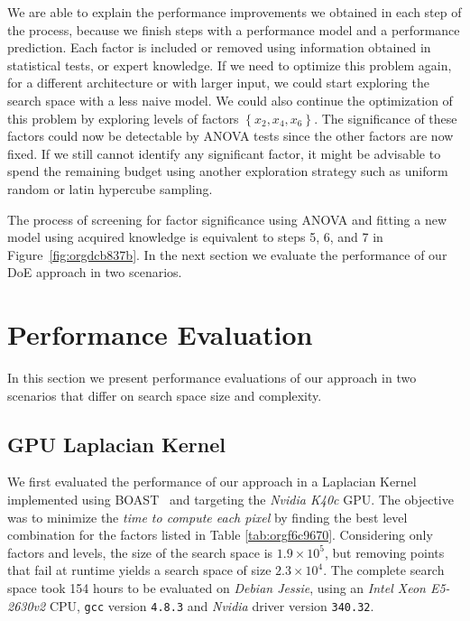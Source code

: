 \documentclass[conference]{IEEEtran}
\begin{document}
We are able to explain the performance improvements we obtained in each step of
the process, because we finish steps with a performance model and a performance
prediction. Each factor is included or removed using information obtained in
statistical tests, or expert knowledge. If we need to optimize this problem
again, for a different architecture or with larger input, we could start
exploring the search space with a less naive model. We could also continue the
optimization of this problem by exploring levels of factors
\(\left\{x_2,x_4,x_6\right\}\). The significance of these factors could now be
detectable by ANOVA tests since the other factors are now fixed. If we still
cannot identify any significant factor, it might be advisable to spend the
remaining budget using another exploration strategy such as uniform random or
latin hypercube sampling.

The process of screening for factor significance using ANOVA and fitting a new
model using acquired knowledge is equivalent to steps 5, 6, and 7 in
Figure~\ref{fig:orgdcb837b}. In the next section we evaluate the
performance of our DoE approach in two scenarios.
\section{Performance Evaluation}
\label{sec:org78a97a1}
In this section we present performance evaluations of our approach in two
scenarios that differ on search space size and complexity.
\vspace{-5pt}
\subsection{GPU Laplacian Kernel}
\label{sec:org756c3cf}
We first evaluated the performance of our approach in a Laplacian Kernel
implemented using BOAST~\cite{videau2017boast} and targeting the \emph{Nvidia
K40c} GPU. The objective was to minimize the \emph{time to compute each pixel} by
finding the best level combination for the factors listed in Table
\ref{tab:orgf6c9670}. Considering only factors and levels, the size of the
search space is \(1.9\times10^5\), but removing points that fail at runtime yields
a search space of size \(2.3\times10^4\). The complete search space took 154 hours
to be evaluated on \emph{Debian Jessie}, using an \emph{Intel Xeon E5-2630v2} CPU,
\texttt{gcc} version \texttt{4.8.3} and \emph{Nvidia} driver version \texttt{340.32}.
\end{document}

